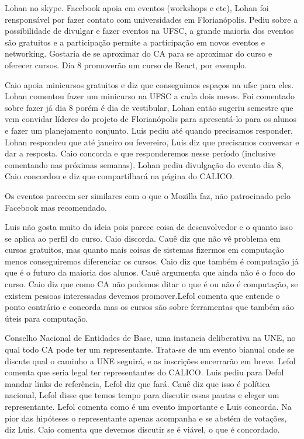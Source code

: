 \documentclass{ata-calico}
\begin{document}
\maketitle

Lohan no skype. Facebook apoia em eventos (workshops e etc), Lohan foi rensponsável por fazer contato com universidades em Florianópolis. Pediu sobre a possibilidade de divulgar e fazer eventos na UFSC, a grande maioria dos eventos são gratuitos e a participação permite a participação em novos eventos e networking. Gostaria de se aproximar do CA para se aproximar do curso e oferecer cursos. Dia 8 promoverão um curso de React, por exemplo.

Caio apoia minicursos gratuitos e diz que conseguimos espaços na ufsc para eles. Lohan comentou fazer um minicurso na UFSC a cada dois meses. Foi comentado sobre fazer já dia 8 porém é dia de vestibular, Lohan então sugeriu semestre que vem convidar líderes do projeto de Florianópolis para apresentá-lo para os alunos e fazer um planejamento conjunto. Luis pediu até quando precisamos responder, Lohan respondeu que até janeiro ou fevereiro, Luis diz que precisamos conversar e dar a resposta. Caio concorda e que responderemos nesse período (inclusive comentando nas próximas semanas). Lohan pediu divulgação do evento dia 8, Caio concordou e diz que compartilhará na página do CALICO.

Os eventos parecem ser similares com o que o Mozilla faz, não patrocinado pelo Facebook mas recomendado.

Luis não gosta muito da ideia pois parece coisa de desenvolvedor e o quanto isso se aplica ao perfil do curso. Caio discorda. Cauê diz que não vê problema em cursos gratuitos, mas quanto mais coisas de sistemas fizermos em computação menos conseguiremos diferenciar os cursos. Caio diz que também é computação já que é o futuro da maioria dos alunos. Cauê argumenta que ainda não é o foco do curso. Caio diz que como CA não podemos ditar o que é ou não é computação, se existem pessoas interessadas devemos promover.Lefol comenta que entende o ponto contrário e concorda mas os cursos são sobre ferramentas que também são úteis para computação.


Conselho Nacional de Entidades de Base, uma instancia deliberativa na UNE, no qual todo CA pode ter um representante. Trata-se de um evento bianual onde se discute qual o caminho a UNE seguirá, e as inscrições encerrarão em breve. Lefol comenta que seria legal ter representantes do CALICO. Luis pediu para Defol mandar links de referência, Lefol diz que fará. Cauê diz que isso é política nacional, Lefol disse que temos tempo para discutir essas pautas e eleger um representante. Lefol comenta como é um evento importante e Luis concorda. Na pior das hipóteses o representante apenas acompanha e se abstém de votações, diz Luis. Caio comenta que devemos discutir se é viável, o que é concordado.
\end{document}

